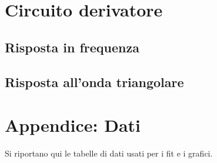 \documentclass[10pt,a4paper]{article}
\begin{document}
\section{Circuito derivatore}

\subsection{Risposta in frequenza}

\subsection{Risposta all'onda triangolare}

\pagebreak
\section{Appendice: Dati}
Si riportano qui le tabelle di dati usati per i fit e i grafici.

\centering
\begin{figure}[h!]
	\begin{minipage}[c]{0.33\textwidth}
		\resizebox{1\textwidth}{!}{
		}
		\label{tab:inv_amp_gain}
	\end{minipage}
	\begin{minipage}[c]{0.33\textwidth}
		\resizebox{1\textwidth}{!}{
		}
		\label{tab:inv_amp_f_domain}
	\end{minipage}
	\begin{minipage}[c]{0.33\textwidth}
		\resizebox{1\textwidth}{!}{
			}
		\label{tab:inv_amp_f_domain}
	\end{minipage}
\end{figure}

\begin{figure}[h!]
	\centering
	\resizebox{0.7\textwidth}{!}{
	}
	\label{tab:lowpass}
\end{figure}

\begin{figure}[h!]
	\centering
	\resizebox{0.7\textwidth}{!}{
	}
	\label{tab:highpass}
\end{figure}
\end{document}
